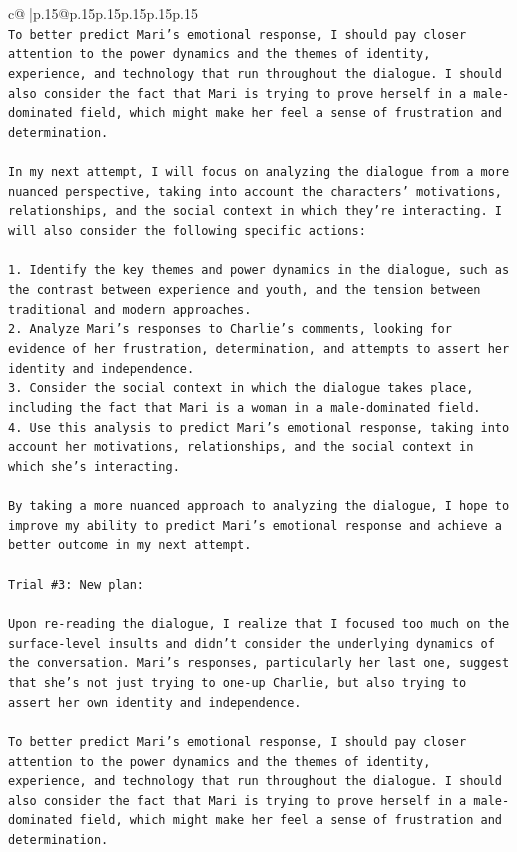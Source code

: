 \documentclass{article}
\begin{document}
{\begin{supertabular}{c@{$\;$}|p{.15\linewidth}@{}p{.15\linewidth}p{.15\linewidth}p{.15\linewidth}p{.15\linewidth}p{.15\linewidth}}
{{{\\ 
\texttt{To better predict Mari's emotional response, I should pay closer attention to the power dynamics and the themes of identity, experience, and technology that run throughout the dialogue. I should also consider the fact that Mari is trying to prove herself in a male{-}dominated field, which might make her feel a sense of frustration and determination.} \\
\\ 
\texttt{In my next attempt, I will focus on analyzing the dialogue from a more nuanced perspective, taking into account the characters' motivations, relationships, and the social context in which they're interacting. I will also consider the following specific actions:} \\
\\ 
\texttt{1. Identify the key themes and power dynamics in the dialogue, such as the contrast between experience and youth, and the tension between traditional and modern approaches.} \\
\texttt{2. Analyze Mari's responses to Charlie's comments, looking for evidence of her frustration, determination, and attempts to assert her identity and independence.} \\
\texttt{3. Consider the social context in which the dialogue takes place, including the fact that Mari is a woman in a male{-}dominated field.} \\
\texttt{4. Use this analysis to predict Mari's emotional response, taking into account her motivations, relationships, and the social context in which she's interacting.} \\
\\ 
\texttt{By taking a more nuanced approach to analyzing the dialogue, I hope to improve my ability to predict Mari's emotional response and achieve a better outcome in my next attempt.} \\
\\ 
\texttt{Trial \#3: New plan: } \\
\\ 
\texttt{Upon re{-}reading the dialogue, I realize that I focused too much on the surface{-}level insults and didn't consider the underlying dynamics of the conversation. Mari's responses, particularly her last one, suggest that she's not just trying to one{-}up Charlie, but also trying to assert her own identity and independence. } \\
\\ 
\texttt{To better predict Mari's emotional response, I should pay closer attention to the power dynamics and the themes of identity, experience, and technology that run throughout the dialogue. I should also consider the fact that Mari is trying to prove herself in a male{-}dominated field, which might make her feel a sense of frustration and determination.} \\
}}}
\end{supertabular}}
\end{document}
